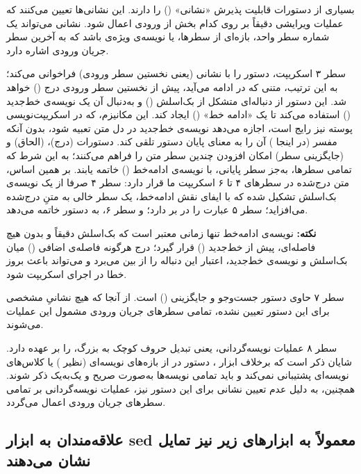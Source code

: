 بسیاری از دستورات  قابلیت پذیرش «نشانی» () را دارند. این نشانی‌ها تعیین می‌کنند که عملیات ویرایشی دقیقاً بر روی کدام بخش از ورودی اعمال شود. نشانی می‌تواند یک شماره سطر واحد، بازه‌ای از سطرها، یا نویسه‌ی ویژه‌ی \cmd{\$} باشد که به آخرین سطر جریان ورودی اشاره دارد.

سطر ۳ اسکریپت، دستور  را با نشانی  (یعنی نخستین سطر ورودی) فراخوانی می‌کند؛ به این ترتیب، متنی که در ادامه می‌آید، پیش از نخستین سطر ورودی درج () خواهد شد. این دستور از دنباله‌ای متشکل از بک‌اسلش (\cmd{\textbackslash}) و به‌دنبال آن یک نویسه‌ی خط‌جدید () استفاده می‌کند تا یک «ادامه خط» () ایجاد کند. این مکانیزم، که در اسکریپت‌نویسی پوسته نیز رایج است، اجازه می‌دهد نویسه‌ی خط‌جدید در دل متن تعبیه شود، بدون آنکه مفسر (در اینجا ) آن را به معنای پایان دستور تلقی کند. دستورات  (درج)،  (الحاق) و  (جایگزینی سطر) امکان افزودن چندین سطر متن را فراهم می‌کنند؛ به این شرط که تمامی سطرها، به‌جز سطر پایانی، با نویسه‌ی ادامه‌خط (\cmd{\textbackslash}) خاتمه یابند. بر همین اساس، متن درج‌شده در سطرهای ۴ تا ۶ اسکریپت ما قرار دارد: سطر ۴ صرفا از یک نویسه‌ی بک‌اسلش تشکیل شده که با ایفای نقش ادامه‌خط، یک سطر خالی به متنِ درج‌شده می‌افزاید؛ سطر ۵ عبارت  را در بر دارد؛ و سطر ۶، به دستور  خاتمه می‌دهد.

\begin{note}
\textbf{نکته:} نویسه‌ی ادامه‌خط تنها زمانی معتبر است که بک‌اسلش دقیقاً و بدون هیچ فاصله‌ای، پیش از خط‌جدید () قرار گیرد؛ درج هرگونه فاصله‌ی اضافی () میان بک‌اسلش و نویسه‌ی خط‌جدید، اعتبار این دنباله را از بین می‌برد و می‌تواند باعث بروز خطا در اجرای اسکریپت شود.
\end{note}

سطر ۷ حاوی دستور جست‌وجو و جایگزینی () است. از آنجا که هیچ نشانیِ مشخصی برای این دستور تعیین نشده، تمامی سطرهای جریان ورودی مشمول این عملیات می‌شوند.

سطر ۸ عملیات نویسه‌گردانی، یعنی تبدیل حروف کوچک به بزرگ، را بر عهده دارد. شایان ذکر است که برخلاف ابزار ، دستور  در  از بازه‌های نویسه‌ای (نظیر \cmd{[a-z]}) یا کلاس‌های نویسه‌ای  پشتیبانی نمی‌کند و باید تمامی نویسه‌ها به‌صورت صریح و یک‌به‌یک ذکر شوند. همچنین، به دلیل عدم تعیین نشانی برای این دستور نیز، عملیات نویسه‌گردانی بر تمامی سطرهای جریان ورودی اعمال می‌گردد.

\subsection{علاقه‌مندان به ابزار sed معمولاً به ابزارهای زیر نیز تمایل نشان می‌دهند}

